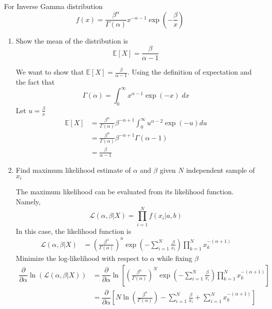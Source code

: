 \documentclass{article}
\begin{document}
For Inverse Gamma distribution 
$$f(x) = \frac{\beta^\alpha}{\Gamma(\alpha)} x^{-\alpha-1}\exp\left(-\frac{\beta}{x}\right)$$
\begin{enumerate}
    \item Show the mean of the distribution is
    $$\mathbb{E}[X] = \frac{\beta}{\alpha - 1}$$
    \color{blue}
    \begin{sol}
    We want to show that $\mathbb{E}[X] = \frac{\beta}{\alpha - 1}$. Using the definition of expectation and the fact that 
    \begin{equation}
            \Gamma(\alpha) = \int_0^{\infty} x^{\alpha-1} \exp(-x) \; dx 
    \end{equation}
    Let $u = \frac{\beta}{x}$
    \begin{align*}
        \mathbb{E}[X] &= \frac{\beta^\alpha}{\Gamma(\alpha)}\beta^{-\alpha +1}\int_{0}^{\infty} u^{\alpha - 2}\exp(-u) du \\
        & = \frac{\beta^\alpha}{\Gamma(\alpha)}\beta^{-\alpha + 1}\Gamma(\alpha-1) \\
        & = \frac{\beta}{\alpha - 1}
    \end{align*}
    \end{sol}
    \color{black}
    \item Find maximum likelihood estimate of $\alpha$ and $\beta$ given $N$ independent sample of $x_i$
    \color{blue}
    \begin{sol}
        The maximum likelihood can be evaluated from its likelihood function. Namely,
    \begin{equation}
        \mathcal{L}(\alpha,\beta|X) = \prod_{i=1}^{N} f(x_i|a,b)
    \end{equation}
    In this case, the likelihood function is
    \begin{align*}
        \mathcal{L}(\alpha,\beta|X) &= \left(\frac{\beta^{\alpha}}{\Gamma(\alpha)}\right)^n\exp\left(-\sum_{i=1}^N\frac{\beta}{x_i}\right) \prod_{k=1}^{N}x^{-(\alpha+1)}_k 
    \end{align*}
    Minimize the log-likelihood with respect to $\alpha$ while fixing $\beta$ 
        \begin{align*}
        \dfrac{\partial}{\partial \alpha}\ln\left(\mathcal{L}(\alpha,\beta|X)\right) &= \dfrac{\partial}{\partial \alpha}\ln\left[\left(\frac{\beta^{\alpha}}{\Gamma(\alpha)}\right)^N\exp\left(-\sum_{i=1}^N\frac{\beta}{x_i}\right) \prod_{k=1}^{N}x^{-(\alpha+1)}_k\right]\\
        &=\dfrac{\partial}{\partial \alpha} \left[N\ln\left(\frac{\beta^{\alpha}}{\Gamma(\alpha)}\right) -\sum_{i=1}^{N}\frac{\beta}{x_i} + \sum_{i=1}^N x_k^{-(\alpha + 1)}\right]\\

\end{align*}
\end{sol}
\end{enumerate}
\end{document}
